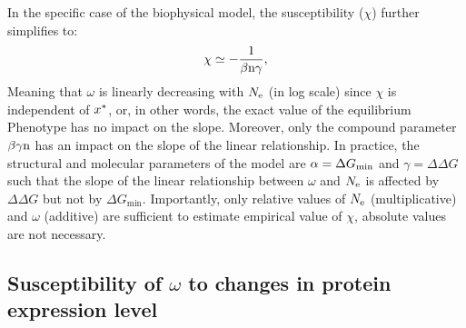 In the specific case of the biophysical model, the susceptibility ($\chi$) further simplifies to:
\begin{gather}
 \chi \simeq -\dfrac{1}{\beta \Nsite \gamma}, \label{eq:chi_application}
\end{gather}
Meaning that $\omega$ is linearly decreasing with $N_{\mathrm{e}}$ (in log scale) since $\chi$ is independent of $x^{*}$, or, in other words, the exact value of the equilibrium \gls{Phenotype} has no impact on the slope.
Moreover, only the compound parameter $\beta \gamma \text{n}$ has an impact on the slope of the linear relationship.
In practice, the structural and molecular parameters of the model are $\alpha = \Delta G_{\text{min}}$ and $\gamma = \Delta \Delta G$ such that the slope of the linear relationship between $\omega$ and $N_{\mathrm{e}}$ is affected by $\Delta \Delta G$ but not by $\Delta G_{\text{min}}$.
Importantly, only relative values of $N_{\mathrm{e}}$ (multiplicative) and $\omega$ (additive) are sufficient to estimate empirical value of $\chi$, absolute values are not necessary.
\subsection{Susceptibility of \texorpdfstring{$\omega$}{ω} to changes in protein expression level}

\label{sec:expression}

